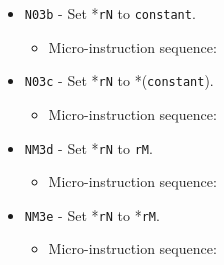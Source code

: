 \documentclass{article}
\def\pkptrout{\Verb|0202| - output *\Verb|pk| to data bus}
\def\tmpatodata{\Verb|2002| - output \Verb|tmpA| to data bus}
\def\tmpaptodata{\Verb|2202| - output *\Verb|tmpA| to data bus}
\def\datatotmpa{\Verb|2402| - write to \Verb|tmpA| from data bus}
\def\regtodata#1{\Verb|#1003| - output \Verb|r#1| to data bus}
\def\regtoaddr#1{\Verb|#1103| - output \Verb|r#1| to addr bus}
\def\writeRAM{\Verb|0004| - write data bus to *(addr bus)}
\def\done{\Verb|fffe| - end instruction}
\begin{document}
\begin{itemize}
    \item \Verb|N03b| - Set *\Verb|rN| to \Verb|constant|.
    \begin{itemize}
        \item Micro-instruction sequence:
    \end{itemize}
    
    \item \Verb|N03c| - Set *\Verb|rN| to *(\Verb|constant|).
    \begin{itemize}
        \item Micro-instruction sequence:
    \end{itemize}
    
    \item \Verb|NM3d| - Set *\Verb|rN| to \Verb|rM|.
    \begin{itemize}
        \item Micro-instruction sequence:
    \end{itemize}

    \item \Verb|NM3e| - Set *\Verb|rN| to *\Verb|rM|.
    \begin{itemize}
        \item Micro-instruction sequence:
    \end{itemize}


\end{itemize}
\end{document}
